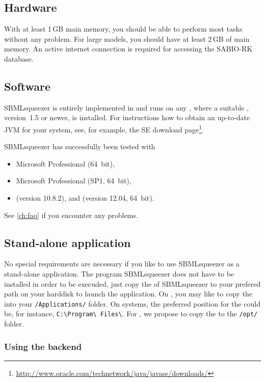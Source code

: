 \subsection{Hardware}

With at least 1\,GB main memory, you should be able to perform most tasks
without any problem. For large models, you should have at least 2\,GB of main
memory. An active internet connection is required for accessing the SABIO-RK
database.

\subsection{Software}\label{sec:SoftwareRequirements}

SBMLsqueezer is entirely implemented in \Java and runs on any \OS, where a 
suitable \JVM, \JDK version~1.5 or newer, is installed.
For instructions how to obtain an up-to-date JVM for your system, see, for 
example, the \Java SE download
page\footnote{\url{http://www.oracle.com/technetwork/java/javase/downloads/}\label{fn:jvmldl}}.

SBMLsqueezer has successfully been tested with
\begin{itemize}
  \item Microsoft \WindowsSeven Professional (64~bit),
  \item Microsoft \WindowsSeven Professional (SP1, 64~bit),
  \item \MacOSX (version 10.8.2), and \UbuntuLinux (version 12.04, 64~bit).
\end{itemize}
See \vref{ch:faq} if you encounter any problems.

\subsection{Stand-alone application}

No special requirements are necessary if you like to use SBMLsqueezer as a
stand-alone application.
The program SBMLsqueezer does not have to be installed in order to be execuded, 
just copy the \JAR of SBMLsqueezer to your prefered path on your harddisk
to launch the application.
On \MacOSX, you may like to copy the \JAR into your \texttt{/Applications/}
folder.
On \Windows systems, the preferred position for the \JAR could be, for
instance, \texttt{C:\textbackslash Program\textbackslash{} Files\textbackslash}.
For \Linux, we propose to copy the \JAR to the \texttt{/opt/} folder.
 

\subsubsection{Using the \JSBML backend}

